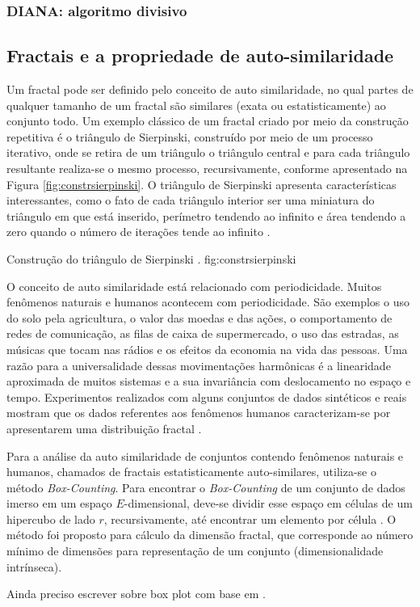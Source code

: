 \subsubsection{DIANA: algoritmo divisivo}





\subsection{Fractais e a propriedade de auto-similaridade}
	\label{subsec:fractais}

Um fractal pode ser definido pelo conceito de auto similaridade, no qual partes
de qualquer tamanho de um fractal são similares (exata ou estatisticamente) ao
conjunto todo. Um exemplo clássico de um fractal criado por meio da construção
repetitiva é o triângulo de Sierpinski, construído por meio de um processo
iterativo, onde se retira de um triângulo o triângulo central e para cada
triângulo resultante realiza-se o mesmo processo, recursivamente, conforme
apresentado na Figura \ref{fig:constrsierpinski}. O triângulo de Sierpinski
apresenta características interessantes, como o fato de cada triângulo interior
ser uma miniatura do triângulo em que está inserido, perímetro tendendo ao
infinito e área tendendo a zero quando o número de iterações tende ao infinito
\cite{Schroeder91}. 

{Construção do triângulo de Sierpinski \cite{Schroeder91}.}
{fig:constrsierpinski}

O conceito de auto similaridade está relacionado com periodicidade. Muitos
fenômenos naturais e humanos acontecem com periodicidade. São exemplos o uso do
solo pela agricultura, o valor das moedas e das ações, o comportamento de redes
de comunicação, as filas de caixa de supermercado, o uso das estradas, as
músicas que tocam nas rádios e os efeitos da economia na vida das pessoas. Uma
razão para a universalidade dessas movimentações harmônicas é a linearidade
aproximada de muitos sistemas e a sua invariância com deslocamento no espaço e
tempo. Experimentos realizados com alguns conjuntos de dados sintéticos e reais
mostram que os dados referentes aos fenômenos humanos caracterizam-se por
apresentarem uma distribuição fractal \cite{Traina2010}.

Para a análise da auto similaridade de conjuntos contendo fenômenos naturais e
humanos, chamados de fractais estatisticamente auto-similares, utiliza-se o
método \textit{Box-Counting}. Para encontrar o \textit{Box-Counting} de um
conjunto de dados imerso em um espaço $E$-dimensional, deve-se dividir esse
espaço em células de um hipercubo de lado $r$, recursivamente, até encontrar um
elemento por célula \cite{Traina2010}. O método foi proposto para cálculo da
dimensão fractal, que corresponde ao número mínimo de dimensões para
representação de um conjunto (dimensionalidade intrínseca). 

Ainda preciso escrever sobre box plot com base em \cite{Traina2010}.
